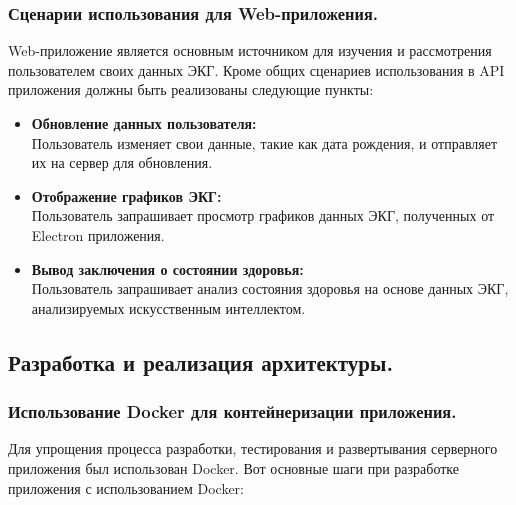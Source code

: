 \documentclass[12pt, russian]{extarticle}
\begin{document}
\begin{spacing}{1.5}
    \subsubsection{Сценарии использования для Web-приложения.}

    Web-приложение является основным источником для изучения и рассмотрения пользователем своих данных ЭКГ.
    Кроме общих сценариев использования в API приложения должны быть реализованы следующие пункты:

    \begin{itemize}
        \item \textbf{Обновление данных пользователя:} \\
            Пользователь изменяет свои данные, такие как дата рождения, и отправляет их на сервер для обновления.
        \item \textbf{Отображение графиков ЭКГ:} \\
            Пользователь запрашивает просмотр графиков данных ЭКГ, полученных от Electron приложения.
        \item \textbf{Вывод заключения о состоянии здоровья:} \\
            Пользователь запрашивает анализ состояния здоровья на основе данных ЭКГ,
            анализируемых искусственным интеллектом.
    \end{itemize}

    \newpage
    \subsection{Разработка и реализация архитектуры.}

    \subsubsection{Использование Docker для контейнеризации приложения.}

    Для упрощения процесса разработки, тестирования и развертывания серверного
    приложения был использован Docker.
    Вот основные шаги при разработке приложения с использованием Docker:


\end{spacing}
\end{document}
